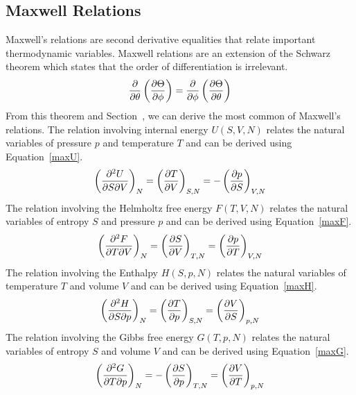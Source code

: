 \subsection{Maxwell Relations}\label{maxwell}
Maxwell's relations are second derivative equalities that relate important thermodynamic variables. Maxwell relations are an extension of the Schwarz theorem which states that the order of differentiation is irrelevant.
\begin{align}
    \pdv{}{\theta}\left(\pdv{\Theta}{\phi}\right)=\pdv{}{\phi}\left(\pdv{\Theta}{\theta}\right)
\end{align}
From this theorem and Section~, we can derive the most common of Maxwell's relations. The relation involving internal energy $U\left(S,V,N\right)$ relates the natural variables of pressure $p$ and temperature $T$ and can be derived using Equation~\ref{maxU}.
\begin{align}
    \left( {\pdv{U}{S}{V}} \right )_{N} = \left( \pdv{T}{V}\right )_{S,N} = - \left( \pdv{p}{S}\right )_{V,N}
\end{align}
The relation involving the Helmholtz free energy $F\left(T,V,N\right)$ relates the natural variables of entropy $S$ and pressure $p$ and can be derived using Equation~\ref{maxF}.
\begin{align}
    \left( {\pdv{F}{T}{V}} \right )_{N} = \left( \pdv{S}{V}\right )_{T,N} = \left( \pdv{p}{T}\right )_{V,N}
\end{align}
The relation involving the Enthalpy $H\left(S,p,N\right)$ relates the natural variables of temperature $T$ and volume $V$ and can be derived using Equation~\ref{maxH}.
\begin{align}
    \left( {\pdv{H}{S}{p}} \right )_{N} = \left( \pdv{T}{p}\right )_{S,N} =  \left( \pdv{V}{S}\right )_{p,N}
\end{align}
The relation involving the Gibbs free energy $G\left(T,p,N\right)$ relates the natural variables of entropy $S$ and volume $V$ and can be derived using Equation~\ref{maxG}.
\begin{align}
    \left( {\pdv{G}{T}{p}} \right )_{N} = -\left( \pdv{S}{p}\right )_{T,N} = \left( \pdv{V}{T}\right )_{p,N}
\end{align}

